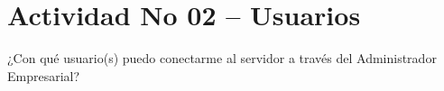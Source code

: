 \section{Actividad No 02 – Usuarios} 
¿Con qué usuario(s) puedo conectarme al servidor a través del Administrador
Empresarial?
